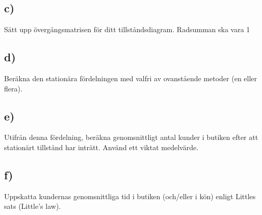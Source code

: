 \documentclass[a4paper]{article}
\begin{document}
\subsection{c)}
Sätt upp övergångsmatrisen för ditt tillståndsdiagram. Radsumman ska vara 1

\subsection{d)}
Beräkna den stationära fördelningen med valfri av ovanstående metoder (en eller
flera).

\subsection{e)}
Utifrån denna fördelning, beräkna genomsnittligt antal kunder i butiken efter att
stationärt tillstånd har inträtt. Använd ett viktat medelvärde.

\subsection{f)}
Uppskatta kundernas genomsnittliga tid i butiken (och/eller i kön) enligt Littles sats
(Little's law).
\end{document}
